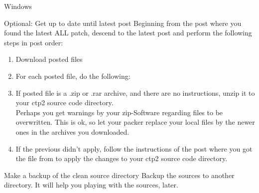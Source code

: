 \begin{section}{Windows}
\begin{subsection}{Optional: Get up to date until latest post}
Beginning from the post where you found the latest ALL patch, descend to the latest post and perform the following steps in post order:

\begin{enumerate}
\item{Download posted files}
\item{For each posted file, do the following:}
\item{If posted file is a .zip or .rar archive, and there are no instructions,
unzip it to your ctp2 source code directory.\\
Perhaps you get warnings by your zip-Software regarding files to be overwritten. This is ok, so let your packer replace your local files by the newer ones in the archives you downloaded.}
\item{If the previous didn't apply, follow the instructions of the post where you got the file from to apply the changes to your ctp2 source code directory.}
\end{enumerate}
\end{subsection}%

\begin{subsection}{Make a backup of the clean source directory}
Backup the sources to another directory. It will help you playing with the sources, later.
\end{subsection}%

\end{section}%
